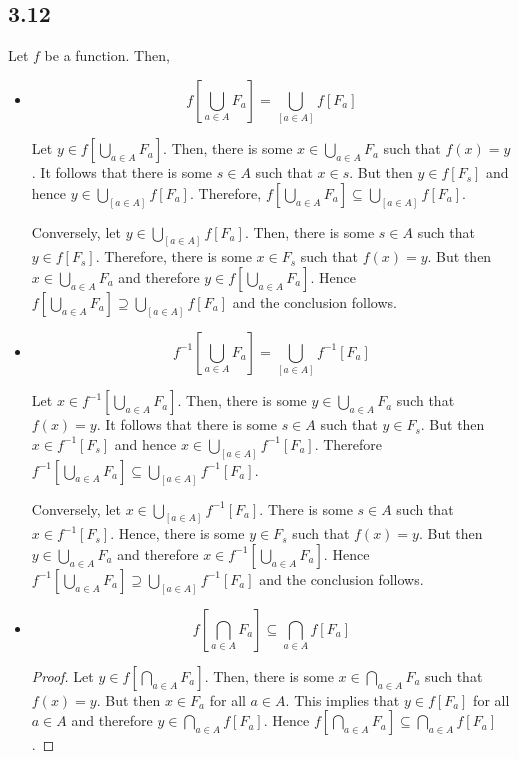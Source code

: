 \subsection*{3.12} Let $f$ be a function. Then,

\begin{itemize}
    \item $$f[\bigcup_{a \in A} F_a] = \bigcup_[a \in A] f[F_a]$$
    
    Let $y \in f[\bigcup_{a \in A} F_a]$. Then, there is some $x \in \bigcup_{a \in A} F_a$ such that $f(x) = y$. It follows that there is some $s \in A$ such that $x \in s$. But then $y \in f[F_s]$ and hence $y \in \bigcup_[a \in A] f[F_a]$. Therefore, $f[\bigcup_{a \in A} F_a] \subseteq \bigcup_[a \in A] f[F_a]$.
    
    Conversely, let $y \in \bigcup_[a \in A] f[F_a]$. Then, there is some $s \in A$ such that $y \in f[F_s]$. Therefore, there is some $x \in F_s$ such that $f(x) = y$. But then $x \in \bigcup_{a \in A} F_a$ and therefore $y \in f[\bigcup_{a \in A} F_a]$. Hence $f[\bigcup_{a \in A} F_a] \supseteq \bigcup_[a \in A] f[F_a]$ and the conclusion follows.
    
    \item $$f^{-1}[\bigcup_{a \in A} F_a] = \bigcup_[a \in A] f^{-1}[F_a]$$
    
    Let $x \in f^{-1}[\bigcup_{a \in A} F_a]$. Then, there is some $y \in \bigcup_{a \in A} F_a$ such that $f(x) = y$. It follows that there is some $s \in A$ such that $y \in F_s$. But then $x \in f^{-1}[F_s]$ and hence $x \in \bigcup_[a \in A] f^{-1}[F_a]$. Therefore $f^{-1}[\bigcup_{a \in A} F_a] \subseteq \bigcup_[a \in A] f^{-1}[F_a]$.
    
    Conversely, let $x \in \bigcup_[a \in A] f^{-1}[F_a]$. There is some $s \in A$ such that $x \in f^{-1}[F_s]$. Hence, there is some $y \in F_s$ such that $f(x) = y$. But then $y \in \bigcup_{a \in A} F_a$ and therefore $x \in f^{-1}[\bigcup_{a \in A} F_a]$. Hence $f^{-1}[\bigcup_{a \in A} F_a] \supseteq \bigcup_[a \in A] f^{-1}[F_a]$ and the conclusion follows.
    
    \item $$f[\bigcap_{a \in A} F_a] \subseteq \bigcap_{a \in A} f[F_a]$$
    
    \begin{proof}
        Let $y \in f[\bigcap_{a \in A} F_a]$. Then, there is some $x \in \bigcap_{a \in A} F_a$ such that $f(x) = y$. But then $x \in F_a$ for all $a \in A$. This implies that $y \in f[F_a]$ for all $a \in A$ and therefore $y \in \bigcap_{a \in A} f[F_a]$. Hence $f[\bigcap_{a \in A} F_a] \subseteq \bigcap_{a \in A} f[F_a]$.
        

\end{proof}
\end{itemize}
